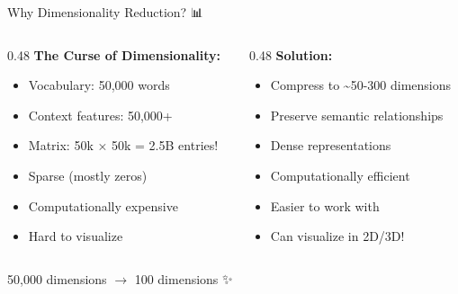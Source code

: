 \documentclass[aspectratio=169]{beamer}
\begin{document}
\begin{frame}[shrink=10]{Why Dimensionality Reduction? 📊}
\begin{columns}[T]
\begin{column}{0.48\textwidth}
\textbf{The Curse of Dimensionality:}
\begin{itemize}\setlength{\itemsep}{0pt}
    \item Vocabulary: 50,000 words
    \item Context features: 50,000+
    \item Matrix: 50k × 50k = 2.5B entries!
    \item Sparse (mostly zeros)
    \item Computationally expensive
    \item Hard to visualize
\end{itemize}
\end{column}

\begin{column}{0.48\textwidth}
\textbf{Solution:}
\begin{itemize}\setlength{\itemsep}{0pt}
    \item Compress to \textasciitilde50-300 dimensions
    \item Preserve semantic relationships
    \item Dense representations
    \item Computationally efficient
    \item Easier to work with
    \item Can visualize in 2D/3D!
\end{itemize}
\end{column}
\end{columns}

\vspace{1em}
\begin{center}
\Large
50,000 dimensions $\rightarrow$ 100 dimensions ✨
\end{center}
\end{frame}
\end{document}
